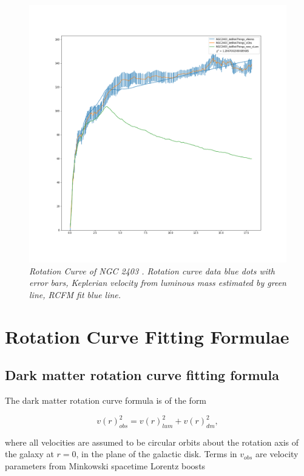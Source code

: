 \documentclass[reprint,%
 amsmath,amssymb,
 aps,
]{revtex4-1}
\begin{document}
  
    
 \begin{figure}[h!]
      \centering
      \includegraphics[width=\linewidth]{NGC2403_deBlokThings_XueSofue}
      \caption{\emph{Rotation Curve of NGC 2403 \cite{Blok1}.   Rotation curve data blue dots with  error bars,  Keplerian velocity from luminous mass estimated by   green line,   RCFM fit blue line.} }
      \label{fig:NGC2403}
  \end{figure}
\section{Rotation Curve Fitting Formulae  \label{sec:dos}}
 \subsection{Dark matter rotation curve fitting formula}
 
  

 The   dark matter rotation curve formula   is of the form

 \begin{equation}
v(r)^2_{obs}  =  v(r)^2_{lum}  +  v(r)^2_{dm},   
\label{eq:zonte1}
\end{equation} 

  where all velocities are assumed to be circular orbits about the rotation axis of the galaxy at  $r=0$, in the plane of the galactic disk. 
Terms in  $v_{obs}$ are velocity parameters   from Minkowski spacetime Lorentz boosts 
   
\end{document}
